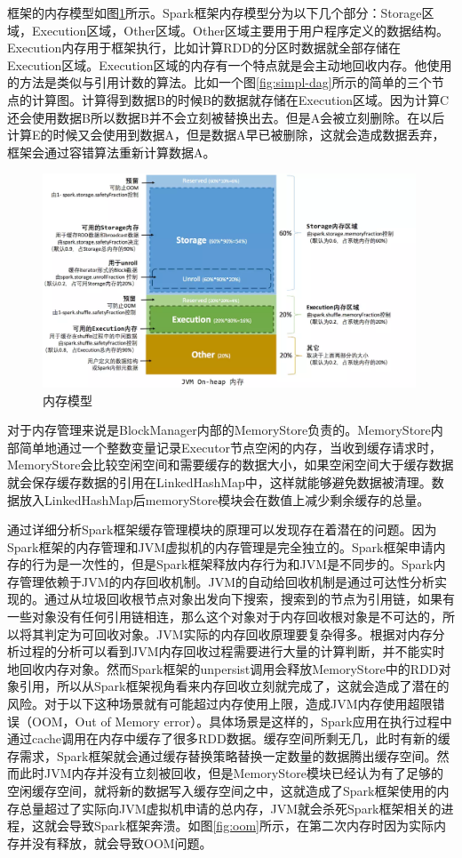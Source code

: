 框架的内存模型如图\ref{fig:memory-model}所示。Spark框架内存模型分为以下几个部分：Storage区域，Execution区域，Other区域。Other区域主要用于用户程序定义的数据结构。Execution内存用于框架执行，比如计算RDD的分区时数据就全部存储在Execution区域。Execution区域的内存有一个特点就是会主动地回收内存。他使用的方法是类似与引用计数的算法。比如一个图\ref{fig:simpl-dag}所示的简单的三个节点的计算图。计算得到数据B的时候B的数据就存储在Execution区域。因为计算C还会使用数据B所以数据B并不会立刻被替换出去。但是A会被立刻删除。在以后计算E的时候又会使用到数据A，但是数据A早已被删除，这就会造成数据丢弃，框架会通过容错算法重新计算数据A。

\begin{figure}[htbp]
    \centering
    \includegraphics[width=0.99\textwidth]{Img/memory-model.png}
    \caption{内存模型}
    \label{fig:memory-model}
\end{figure}

对于内存管理来说是BlockManager内部的MemoryStore负责的。MemoryStore内部简单地通过一个整数变量记录Executor节点空闲的内存，当收到缓存请求时，MemoryStore会比较空闲空间和需要缓存的数据大小，如果空闲空间大于缓存数据就会保存缓存数据的引用在LinkedHashMap中，这样就能够避免数据被清理。数据放入LinkedHashMap后memoryStore模块会在数值上减少剩余缓存的总量。

通过详细分析Spark框架缓存管理模块的原理可以发现存在着潜在的问题。因为Spark框架的内存管理和JVM虚拟机的内存管理是完全独立的。Spark框架申请内存的行为是一次性的，但是Spark框架释放内存行为和JVM是不同步的。Spark内存管理依赖于JVM的内存回收机制。JVM的自动给回收机制是通过可达性分析实现的。通过从垃圾回收根节点对象出发向下搜索，搜索到的节点为引用链，如果有一些对象没有任何引用链相连，那么这个对象对于内存回收根对象是不可达的，所以将其判定为可回收对象。JVM实际的内存回收原理要复杂得多。根据对内存分析过程的分析可以看到JVM内存回收过程需要进行大量的计算判断，并不能实时地回收内存对象。然而Spark框架的unpersist调用会释放MemoryStore中的RDD对象引用，所以从Spark框架视角看来内存回收立刻就完成了，这就会造成了潜在的风险。对于以下这种场景就有可能超过内存使用上限，造成JVM内存使用超限错误（OOM，Out of Memory error）。具体场景是这样的，Spark应用在执行过程中通过cache调用在内存中缓存了很多RDD数据。缓存空间所剩无几，此时有新的缓存需求，Spark框架就会通过缓存替换策略替换一定数量的数据腾出缓存空间。然而此时JVM内存并没有立刻被回收，但是MemoryStore模块已经认为有了足够的空闲缓存空间，就将新的数据写入缓存空间之中，这就造成了Spark框架使用的内存总量超过了实际向JVM虚拟机申请的总内存，JVM就会杀死Spark框架相关的进程，这就会导致Spark框架奔溃。如图\ref{fig:oom}所示，在第二次内存时因为实际内存并没有释放，就会导致OOM问题。


